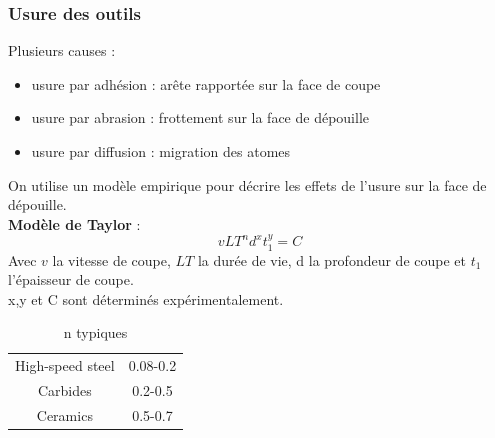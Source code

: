 \documentclass[../main.tex]{subfiles}
\begin{document}
\subsubsection{Usure des outils}
Plusieurs causes : \begin{itemize}
    \item usure par adhésion : arête rapportée sur la face de coupe\\
    \item usure par abrasion : frottement sur la face de dépouille\\
    \item usure par diffusion : migration des atomes\\
\end{itemize}

On utilise un modèle empirique pour décrire les effets de l'usure sur la face de dépouille.\\
\quad \textbf{Modèle de Taylor} : \\
\begin{equation}
    vLT^n d^x t_1^y = C
\end{equation}
Avec $v$ la vitesse de coupe, $LT$ la durée de vie, d la profondeur de coupe et $t_1$ l'épaisseur de coupe.\\
x,y et C sont déterminés expérimentalement.\\
\begin{table}[hbt!]
    \centering
    \begin{tabular}{c|c}
        \hline
        High-speed steel & 0.08-0.2  \\
        Carbides & 0.2-0.5\\
        Ceramics & 0.5-0.7\\
        \hline
    \end{tabular}
    \caption{n typiques}
\end{table}
\end{document}
